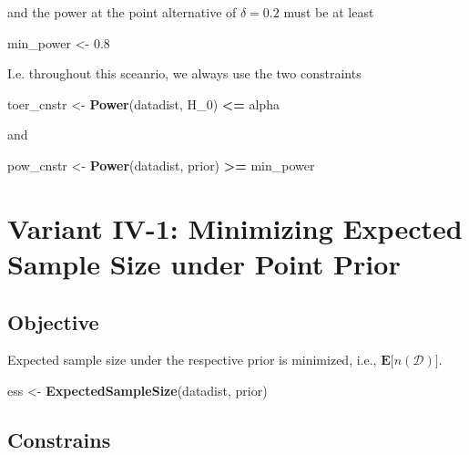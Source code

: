 \documentclass[]{book}
\newenvironment{Shaded}{\begin{snugshade}}{\end{snugshade}}
\newcommand{\DecValTok}[1]{\textcolor[rgb]{0.00,0.00,0.81}{#1}}
\newcommand{\FloatTok}[1]{\textcolor[rgb]{0.00,0.00,0.81}{#1}}
\newcommand{\KeywordTok}[1]{\textcolor[rgb]{0.13,0.29,0.53}{\textbf{#1}}}
\newcommand{\NormalTok}[1]{#1}
\newcommand{\OperatorTok}[1]{\textcolor[rgb]{0.81,0.36,0.00}{\textbf{#1}}}
\newcommand{\StringTok}[1]{\textcolor[rgb]{0.31,0.60,0.02}{#1}}
\begin{document}
and the power at the point alternative of \(\delta=0.2\) must
be at least

\begin{Shaded}
\begin{Highlighting}[]
\NormalTok{min_power <-}\StringTok{ }\FloatTok{0.8}
\end{Highlighting}
\end{Shaded}

I.e. throughout this sceanrio, we always use the two
constraints

\begin{Shaded}
\begin{Highlighting}[]
\NormalTok{toer_cnstr <-}\StringTok{ }\KeywordTok{Power}\NormalTok{(datadist, H_}\DecValTok{0}\NormalTok{) }\OperatorTok{<=}\StringTok{ }\NormalTok{alpha}
\end{Highlighting}
\end{Shaded}

and

\begin{Shaded}
\begin{Highlighting}[]
\NormalTok{pow_cnstr <-}\StringTok{ }\KeywordTok{Power}\NormalTok{(datadist, prior) }\OperatorTok{>=}\StringTok{ }\NormalTok{min_power}
\end{Highlighting}
\end{Shaded}

\hypertarget{variantIV_1}{%
\section{Variant IV-1: Minimizing Expected Sample Size under Point Prior}\label{variantIV_1}}

\hypertarget{objective-7}{%
\subsection{Objective}\label{objective-7}}

Expected sample size under the respective prior is minimized, i.e.,
\(\boldsymbol{E}\big[n(\mathcal{D})\big]\).

\begin{Shaded}
\begin{Highlighting}[]
\NormalTok{ess <-}\StringTok{ }\KeywordTok{ExpectedSampleSize}\NormalTok{(datadist, prior)}
\end{Highlighting}
\end{Shaded}

\hypertarget{constrains-7}{%
\subsection{Constrains}\label{constrains-7}}
\end{document}
